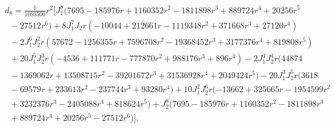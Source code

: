 \documentclass[aps,twocolumn,groupedaddress]{revtex4}
\begin{document}
\begin{widetext}
\begin{eqnarray}
&& d_8=\frac{1}{1093500}r^2\Big[J_1^8(7695-185976r+1160352r^2-1811898r^3+889724r^4+20256r^5\nonumber\\
&& \; \; -27512r^6)+8J_1^7J_2r(-10044+212661r-1119348r^2+371668r^3+27120r^4)\nonumber\\
&& \; \; -2J_1^6J_2^2r(57672-1256355r+7596708r^2-19368452r^3+3177376r^4+819808r^5)\nonumber\\
&& \; \; +20J_1^5J_2^3r(-4536+111771r-777870r^2+988176r^3+896r^4)-2J_1^4J_2^4r(44874\nonumber\\
&& \; \; -1369062r+13508715r^2-39201672r^3+31536928r^4+2049424r^5)-20J_1^3J_2^5r(3618\nonumber\\
&& \; \; -69579r+233613r^2-237744r^3+93280r^4)+10J_1^2J_2^6r(-13662+325665r-1954599r^2\nonumber\\
&& \; \; +3232376r^3-2405088r^4+818624r^5)+J_2^8(7695-185976r+1160352r^2-1811898r^3\nonumber\\
&& \; \; +889724r^4+20256r^5-27512r^6)\Big] .\nonumber
\end{eqnarray}
\end{widetext}
\end{document}
